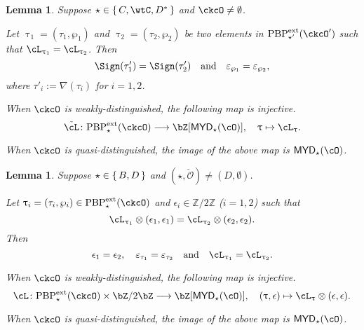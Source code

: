 \documentclass[12pt,a4paper]{amsart}
\newcommand{\AC}{\mathrm{AC}}
\def\MYD{{\mathsf{MYD}}}
\def\AND{\quad\text{and}\quad}
\def\oAC#1{\AC(#1)}
\def\AC{\mathrm{AC}}
\def\ac{\cL}
\def\lotimes{\otimes}
\newcommand{\CO}{{\mathcal {O}}}
\newcommand{\Z}{\mathbb{Z}}
\def\DD{\nabla}
\numberwithin{equation}{section}
\newtheorem{lem}[thm]{Lemma}
\theoremstyle{remark}
\def\PBPe{\mathrm{PBP}^{\mathrm{ext}}}
\def\PBPes{\mathrm{PBP}^{\mathrm{ext}}_{\star}}
\def\PBPesp{\mathrm{PBP}^{\mathrm{ext}}_{\star'}}
\def\ckcOp{\ckcO^{\prime}}
\def\cOp{\cO^{\prime}}
\begin{document}
\begin{lem}\label{lem:C}
Suppose $\star \in \set{C,\wtC,D^{*}}$ and $\ckcO\neq \emptyset$.
  \begin{enuma}
    \item Let $\uptau_{1} = (\tau_{1},\wp_{1})$ and $\uptau_{2}=(\tau_{2},\wp_{2})$ be two elements in
    $\PBPesp(\ckcOp)$ such that $\ac_{\uptau_{1}} =  \ac_{\uptau_{2}}$.
    Then
    \[\Sign(\tau'_{1})=\Sign(\tau'_{2}) \quad \text{and} \quad \varepsilon_{\wp_{1}}=\varepsilon_{\wp_{2}},
    \]
    where $\tau'_{i} := \DD(\tau_{i})$ for $i=1,2$.
    \item When $\ckcO$ is weakly-distinguished, the following map is injective.
    \[
      \acme \colon
      \PBPes( \ckcO )\longrightarrow \bZ[\MYD_{\star}(\cO)],
      \quad \uptau\mapsto \ac_{\uptau}.
    \]
    \item When $\ckcO$ is quasi-distinguished, the image of the above map is $\MYD_{\star}(\cO)$.
  \end{enuma}
\end{lem}


\begin{lem}\label{lem:BD}
Suppose $\star \in \set{B,D}$ and $(\star, \check \CO)\neq (D, \emptyset)$.
  \begin{enuma}
  \item Let $\uptau_i=(\tau_i, \wp_i)\in \PBPe_\star(\ckcO)$ and
  $\epsilon_i\in \Z/2\Z$ ($i=1,2$) such that
  \[
    \ac_{\uptau_1}\lotimes (\epsilon_{1},\epsilon_{1})= \ac_{\uptau_2}\lotimes( \epsilon_{2},\epsilon_{2} ).
  \]
  Then
  \[
    \epsilon_1=\epsilon_2,\quad \varepsilon_{\tau_1}=\varepsilon_{\tau_2} \AND \ac_{\uptau_{1}}=\ac_{\uptau_{2}}.
  \]

  \item When $\ckcO$ is weakly-distinguished, the following map is injective.
  \[
    \acm \colon
    \PBPes( \ckcO )\times \bZ/2\bZ \longrightarrow \bZ[\MYD_{\star}(\cO)],\quad
    (\uptau,\epsilon) \mapsto \ac_{\uptau}\otimes (\epsilon, \epsilon).
  \]
  \item When $\ckcO$ is quasi-distinguished, the image of the above map is $\MYD_{\star}(\cO)$.
\end{enuma}
\end{lem}
\end{document}
